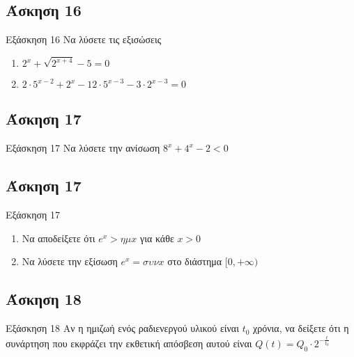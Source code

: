 \documentclass[greek]{beamer}
\begin{document}
\subsection{Άσκηση 16}
\begin{frame}[label=Άσκηση16,t]{Εξάσκηση 16}
 Να λύσετε τις εξισώσεις
 \begin{enumerate}
  \item<1-> $2^x+\sqrt{2^{x+4}}-5=0$
  \item<2-> $2\cdot 5^{x-2}+2^x-12\cdot 5^{x-3}-3\cdot 2^{x-3}=0$
 \end{enumerate}

\end{frame}

\subsection{Άσκηση 17}
\begin{frame}[label=Άσκηση17,t]{Εξάσκηση 17}
  Να λύσετε την ανίσωση $8^x+4^x-2<0$

\end{frame}

\subsection{Άσκηση 17}
\begin{frame}[label=Άσκηση17,t]{Εξάσκηση 17}
  \begin{enumerate}
    \item<1-> Να αποδείξετε ότι $e^x>ημx$ για κάθε $x>0$
    \item<2-> Να λύσετε την εξίσωση $e^x=συνx$ στο διάστημα $[0,+\infty)$
  \end{enumerate}

\end{frame}

\subsection{Άσκηση 18}
\begin{frame}[label=Άσκηση18,t]{Εξάσκηση 18}
  Αν η ημιζωή ενός ραδιενεργού υλικού είναι $t_0$ χρόνια, να δείξετε ότι η συνάρτηση που εκφράζει την εκθετική απόσβεση αυτού είναι $Q(t)=Q_0\cdot 2^{-\frac{t}{t_0}}$

\end{frame}
\end{document}
